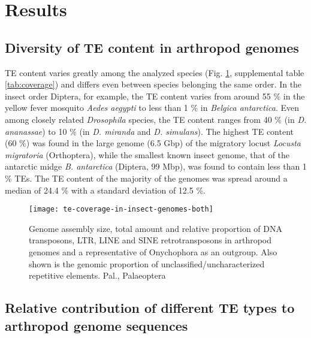 \section{Results}

\subsection{Diversity of TE content in arthropod
genomes}

TE content varies greatly among the analyzed species (Fig. \ref{fig:te-coverage},
supplemental table \ref{tab:coverage}) and differs even between species belonging the
same order. In the insect order Diptera, for example, the TE content
varies from around 55 \% in the yellow fever mosquito \emph{Aedes
aegypti} to less than 1 \% in \emph{Belgica antarctica}. Even among
closely related \emph{Drosophila} species, the TE content ranges from 40
\% (in \emph{D. ananassae}) to 10 \% (in \emph{D. miranda} and \emph{D.
simulans}). The highest TE content (60 \%) was found in the large genome
(6.5 Gbp) of the migratory locust \emph{Locusta migratoria}
(Orthoptera), while the smallest known insect genome, that of the
antarctic midge \emph{B. antarctica} (Diptera, 99 Mbp), was found to
contain less than 1 \% TEs. The TE content of the majority of the
genomes was spread around a median of 24.4 \% with a standard deviation
of 12.5 \%.

\begin{figure}[h!]
\begin{center}
\texttt{[image: te-coverage-in-insect-genomes-both]}
\caption[Arthropod genome size and TE coverage]{{Genome assembly size, total amount and relative proportion of DNA
transposons, LTR, LINE and SINE retrotransposons in arthropod genomes
and a representative of Onychophora as an outgroup. Also shown is the
genomic proportion of unclassified/uncharacterized repetitive elements.
Pal., Palaeoptera%
\label{fig:te-coverage}
}}
\end{center}
\end{figure}

\subsection{Relative contribution of different TE types to arthropod
genome
sequences}

